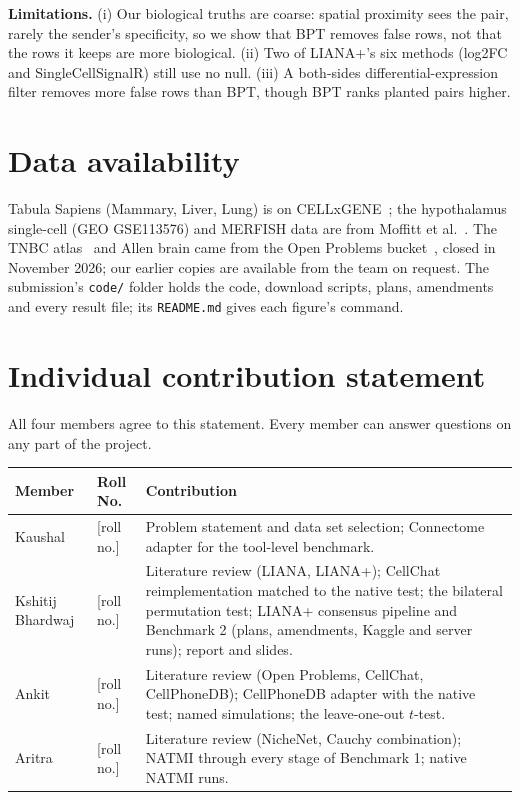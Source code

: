 \documentclass[11pt]{article}
\newcommand{\BPT}{BPT}
\begin{document}
\textbf{Limitations.} (i) Our biological truths are coarse: spatial proximity sees the pair, rarely the sender's
specificity, so we show that \BPT{} removes false rows, not that the rows it keeps are more biological.
(ii) Two of LIANA+'s six methods (log2FC and SingleCellSignalR) still use no null. (iii) A both-sides
differential-expression filter removes more false rows than \BPT, though \BPT{} ranks planted pairs higher.

\section{Data availability}

Tabula Sapiens (Mammary, Liver, Lung) is on CELLxGENE~\cite{tabula2022}; the hypothalamus single-cell (GEO
GSE113576) and MERFISH data are from Moffitt et al.~\cite{moffitt2018}. The TNBC atlas~\cite{wu2021} and Allen brain
came from the Open Problems bucket~\cite{openproblems}, closed in November 2026; our earlier copies are available from
the team on request. The submission's \texttt{code/} folder holds the code, download scripts, plans, amendments and
every result file; its \texttt{README.md} gives each figure's command.


{\footnotesize\setlength{\bibsep}{1.5pt}}

\clearpage
\section*{Individual contribution statement}

All four members agree to this statement. Every member can answer questions on any part of the project.

\vspace{6pt}
\begin{center}
\renewcommand{\arraystretch}{1.35}
\begin{tabularx}{\textwidth}{@{}l l X@{}}
\toprule
Member & Roll No. & Contribution\\
\midrule
Kaushal & [roll no.] & Problem statement and data set selection; Connectome adapter for the tool-level benchmark.\\
Kshitij Bhardwaj & [roll no.] & Literature review (LIANA, LIANA+); CellChat reimplementation matched to the native test; the
bilateral permutation test; LIANA+ consensus pipeline and Benchmark 2 (plans, amendments, Kaggle and server runs);
report and slides.\\
Ankit & [roll no.] & Literature review (Open Problems, CellChat, CellPhoneDB); CellPhoneDB adapter with the native test;
named simulations; the leave-one-out $t$-test.\\
Aritra & [roll no.] & Literature review (NicheNet, Cauchy combination); NATMI through every stage of Benchmark 1; native
NATMI runs.\\
\bottomrule
\end{tabularx}
\end{center}
\end{document}
